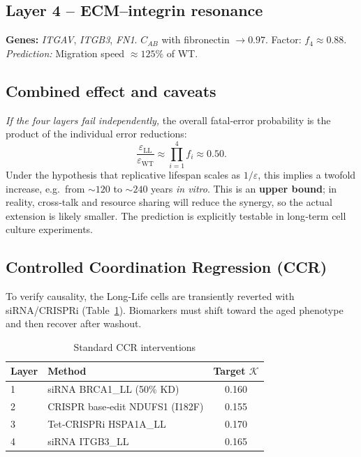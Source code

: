 \documentclass[12pt,a4paper]{article}
\newcommand{\REL}{\mathcal{K}}          %
\begin{document}
	\subsection{Layer 4 – ECM–integrin resonance}
	\textbf{Genes:} \emph{ITGAV}, \emph{ITGB3}, \emph{FN1}. \(C_{AB}\) with fibronectin \(\to 0.97\).  
	Factor: \(f_4 \approx 0.88\).  
	\textit{Prediction:} Migration speed \(\approx 125\%\) of WT.
	
	\subsection{Combined effect and caveats}
	\textit{If the four layers fail independently,} the overall fatal‑error probability is the product of the individual error reductions:
	\[
	\frac{\varepsilon_{\mathrm{LL}}}{\varepsilon_{\mathrm{WT}}} \approx \prod_{i=1}^{4} f_i \approx 0.50.
	\]
	Under the hypothesis that replicative lifespan scales as \(1/\varepsilon\), this implies a twofold increase, e.g.\ from \(\sim 120\) to \(\sim 240\) years \textit{in vitro}. This is an \textbf{upper bound}; in reality, cross‑talk and resource sharing will reduce the synergy, so the actual extension is likely smaller. The prediction is explicitly testable in long‑term cell culture experiments.
	
	\subsection{Controlled Coordination Regression (CCR)}
	To verify causality, the Long‑Life cells are transiently reverted with siRNA/CRISPRi (Table~\ref{tab:CCR}). Biomarkers must shift toward the aged phenotype and then recover after washout.
	
	\begin{table}[H]
		\centering
		\caption{Standard CCR interventions}
		\label{tab:CCR}
		\begin{tabular}{@{}llc@{}}
			\toprule
			\textbf{Layer} & \textbf{Method} & \textbf{Target \(\REL\)} \\
			\midrule
			1 & siRNA BRCA1\_LL (50\% KD) & 0.160 \\
			2 & CRISPR base‑edit NDUFS1 (I182F) & 0.155 \\
			3 & Tet‑CRISPRi HSPA1A\_LL & 0.170 \\
			4 & siRNA ITGB3\_LL & 0.165 \\
			\bottomrule
		\end{tabular}
	\end{table}
	
\end{document}

